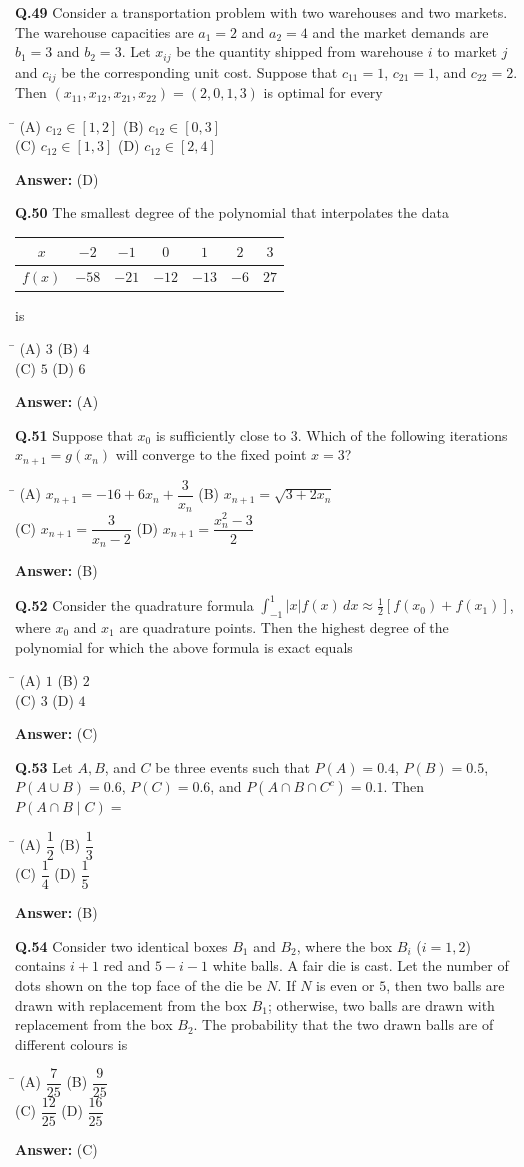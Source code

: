 \documentclass[11pt,a4paper]{article}
\newcommand{\optsfourA}[4]{%
  \begin{tabbing}
    \hspace{0.48\linewidth}\=\kill
    (A) #1 \> (B) #2 \\[2pt]
    (C) #3 \> (D) #4
  \end{tabbing}%
}
\newcommand{\ans}[1]{\textbf{Answer:} #1\par\medskip}
\begin{document}
\textbf{Q.49} Consider a transportation problem with two warehouses and two markets. The warehouse capacities are $a_1 = 2$ and $a_2 = 4$ and the market demands are $b_1 = 3$ and $b_2 = 3$. Let $x_{ij}$ be the quantity shipped from warehouse $i$ to market $j$ and $c_{ij}$ be the corresponding unit cost. Suppose that $c_{11} = 1$, $c_{21} = 1$, and $c_{22} = 2$. Then $(x_{11}, x_{12}, x_{21}, x_{22}) = (2, 0, 1, 3)$ is optimal for every
\optsfourA{$c_{12} \in [1, 2]$}{$c_{12} \in [0, 3]$}{$c_{12} \in [1, 3]$}{$c_{12} \in [2, 4]$}
\ans{(D)}

\textbf{Q.50} The smallest degree of the polynomial that interpolates the data
\begin{center}
\begin{tabular}{ccccccc}
  \toprule
  $x$ & $-2$ & $-1$ & $0$ & $1$ & $2$ & $3$ \\
  \midrule
  $f(x)$ & $-58$ & $-21$ & $-12$ & $-13$ & $-6$ & $27$ \\
  \bottomrule
\end{tabular}
\end{center}
is
\optsfourA{$3$}{$4$}{$5$}{$6$}
\ans{(A)}

\textbf{Q.51} Suppose that $x_0$ is sufficiently close to $3$. Which of the following iterations $x_{n+1} = g(x_n)$ will converge to the fixed point $x = 3$?
\optsfourA{$x_{n+1} = -16 + 6x_n + \dfrac{3}{x_n}$}{$x_{n+1} = \sqrt{3 + 2x_n}$}{$x_{n+1} = \dfrac{3}{x_n - 2}$}{$x_{n+1} = \dfrac{x_n^2 - 3}{2}$}
\ans{(B)}

\textbf{Q.52} Consider the quadrature formula $\displaystyle\int_{-1}^{1} |x|f(x)\,dx \approx \frac{1}{2}[f(x_0) + f(x_1)]$, where $x_0$ and $x_1$ are quadrature points. Then the highest degree of the polynomial for which the above formula is exact equals
\optsfourA{$1$}{$2$}{$3$}{$4$}
\ans{(C)}

\textbf{Q.53} Let $A, B$, and $C$ be three events such that $P(A) = 0.4$, $P(B) = 0.5$, $P(A \cup B) = 0.6$, $P(C) = 0.6$, and $P(A \cap B \cap C^c) = 0.1$. Then $P(A \cap B \mid C) =$
\optsfourA{$\dfrac{1}{2}$}{$\dfrac{1}{3}$}{$\dfrac{1}{4}$}{$\dfrac{1}{5}$}
\ans{(B)}

\textbf{Q.54} Consider two identical boxes $B_1$ and $B_2$, where the box $B_i$ ($i = 1, 2$) contains $i + 1$ red and $5 - i - 1$ white balls. A fair die is cast. Let the number of dots shown on the top face of the die be $N$. If $N$ is even or $5$, then two balls are drawn with replacement from the box $B_1$; otherwise, two balls are drawn with replacement from the box $B_2$. The probability that the two drawn balls are of different colours is
\optsfourA{$\dfrac{7}{25}$}{$\dfrac{9}{25}$}{$\dfrac{12}{25}$}{$\dfrac{16}{25}$}
\ans{(C)}
\end{document}

